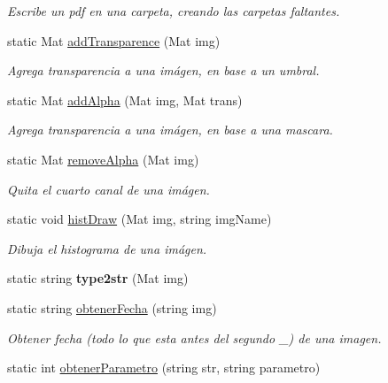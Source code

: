 \begin{DoxyCompactItemize}
\begin{DoxyCompactList}\small\item\em Escribe un pdf en una carpeta, creando las carpetas faltantes. \end{DoxyCompactList}\item 
static Mat \mbox{\hyperlink{classCommonFunctions_a66c8badc3cb8d173aaac77a3acdbec4c}{add\+Transparence}} (Mat img)
\begin{DoxyCompactList}\small\item\em Agrega transparencia a una imágen, en base a un umbral. \end{DoxyCompactList}\item 
static Mat \mbox{\hyperlink{classCommonFunctions_acede9b6245c18d795b94b7c2261671b1}{add\+Alpha}} (Mat img, Mat trans)
\begin{DoxyCompactList}\small\item\em Agrega transparencia a una imágen, en base a una mascara. \end{DoxyCompactList}\item 
static Mat \mbox{\hyperlink{classCommonFunctions_a511266d1137ccdefb6e7c5d156145831}{remove\+Alpha}} (Mat img)
\begin{DoxyCompactList}\small\item\em Quita el cuarto canal de una imágen. \end{DoxyCompactList}\item 
static void \mbox{\hyperlink{classCommonFunctions_a7b0e52ec4c30af5244724936f163c2d1}{hist\+Draw}} (Mat img, string img\+Name)
\begin{DoxyCompactList}\small\item\em Dibuja el histograma de una imágen. \end{DoxyCompactList}\item 
\mbox{\label{classCommonFunctions_a46eb03d173a7e2ec7459a49a78e40d48}} 
static string {\bfseries type2str} (Mat img)
\item 
static string \mbox{\hyperlink{classCommonFunctions_a6b4829d1fab8cd74c15c540cf97fe237}{obtener\+Fecha}} (string img)
\begin{DoxyCompactList}\small\item\em Obtener fecha (todo lo que esta antes del segundo \+\_\+) de una imagen. \end{DoxyCompactList}\item 
static int \mbox{\hyperlink{classCommonFunctions_adb7c245caab42a6dc8f484527dd2d447}{obtener\+Parametro}} (string str, string parametro)

\end{DoxyCompactItemize}
